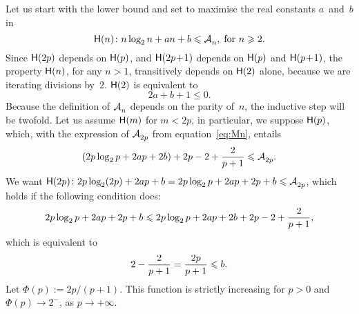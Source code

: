 Let us start with the lower bound and set to maximise the
real constants \(a\)~and~\(b\) in
\begin{equation*}
\abovedisplayskip=0pt
\belowdisplayskip=2pt
\pred{H}{n} \colon n\log_2 n + an + b \leqslant \M{}{n},
\; \text{for \(n \geqslant 2\).}
\end{equation*}
Since \(\textsf{H}({2p})\) depends on \(\textsf{H}({p})\), and
\(\textsf{H}({2p\!+\!1})\) depends on \(\textsf{H}({p})\) and
\(\textsf{H}({p\!+\!1})\), the property \(\textsf{H}({n})\), for any \(n>1\),
transitively depends on \(\textsf{H}({2})\) alone, because we are
iterating divisions by~\(2\). \(\textsf{H}({2})\) is equivalent to
\begin{equation}
2a + b + 1 \leqslant 0.
\label{ineq:base_lower_Atms}
\end{equation}
Because the definition of \(\mathcal{A}_{n}^{}\) depends on the parity of~\(n\),
the inductive step will be twofold. Let us assume \(\textsf{H}({m})\) for
\(m < 2p\), in particular, we suppose \(\textsf{H}({p})\), which, with the
expression of \(\mathcal{A}_{2p}^{}\) from equation~\eqref{eq:Mn}, entails
\begin{equation*}
\abovedisplayskip=2pt
\belowdisplayskip=2pt
 (2p\log_2 p + 2ap + 2b) + 2p - 2 + \frac{2}{p+1} \leqslant \M{}{2p}.
\end{equation*}
We want \(\textsf{H}({2p}) \colon 2p\log_2(2p) + 2ap + b
= 2p\log_2 p + 2ap + 2p + b \leqslant \mathcal{A}_{2p}^{}\), which holds
if the following condition does:
\begin{equation*}
\abovedisplayskip=0pt
\belowdisplayskip=2pt
2p\log_2 p + 2ap + 2p + b \leqslant 2p\log_2 p + 2ap + 2b + 2p - 2 + \frac{2}{p+1},
\end{equation*}
which is equivalent to
\begin{equation*}
\abovedisplayskip=0pt
\belowdisplayskip=2pt
2 - \frac{2}{p+1} = \frac{2p}{p+1} \leqslant b.
\end{equation*}
Let \(\Phi(p) := 2p/(p+1)\). This function is strictly increasing for
\(p > 0\) and \(\Phi(p) \to 2^{-}\), as \(p \to +\infty\).

